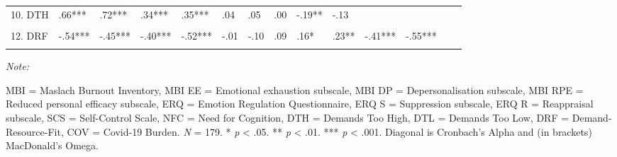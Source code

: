 \documentclass[
  english,
  man,floatsintext]{apa6}
\begin{document}
\begin{landscape}
\begin{table}
{\begin{threeparttable}
\begin{tabular}[t]{llllllllllllll}
10. DTH & .66*** & .72*** & .34*** & .35*** & .04 & .05 & .00 & -.19** & -.13 &  &  &  & \\
\addlinespace
\cellcolor{gray!6}{11. DTL} & \cellcolor{gray!6}{.44***} & \cellcolor{gray!6}{.35***} & \cellcolor{gray!6}{.37***} & \cellcolor{gray!6}{.42***} & \cellcolor{gray!6}{.01} & \cellcolor{gray!6}{.16*} & \cellcolor{gray!6}{-.13} & \cellcolor{gray!6}{-.18*} & \cellcolor{gray!6}{-.15*} & \cellcolor{gray!6}{.40***} & \cellcolor{gray!6}{} & \cellcolor{gray!6}{} & \cellcolor{gray!6}{}\\
12. DRF & -.54*** & -.45*** & -.40*** & -.52*** & -.01 & -.10 & .09 & .16* & .23** & -.41*** & -.55*** &  & \\
\cellcolor{gray!6}{13. COV} & \cellcolor{gray!6}{.23**} & \cellcolor{gray!6}{.32***} & \cellcolor{gray!6}{.07} & \cellcolor{gray!6}{.00} & \cellcolor{gray!6}{-.02} & \cellcolor{gray!6}{.02} & \cellcolor{gray!6}{-.06} & \cellcolor{gray!6}{-.03} & \cellcolor{gray!6}{.14} & \cellcolor{gray!6}{.44***} & \cellcolor{gray!6}{.08} & \cellcolor{gray!6}{-.12} & \cellcolor{gray!6}{}\\
\bottomrule
\end{tabular}
\begin{tablenotes}
\item \textit{Note: } 
\item MBI = Maslach Burnout Inventory, MBI EE = Emotional exhaustion subscale, MBI DP = Depersonalisation subscale, MBI RPE = Reduced personal efficacy subscale, ERQ = Emotion Regulation Questionnaire, ERQ S = Suppression subscale, ERQ R = Reappraisal subscale, SCS = Self-Control Scale, NFC = Need for Cognition, DTH = Demands Too High, DTL = Demands Too Low, DRF = Demand-Resource-Fit, COV = Covid-19 Burden. \textit{N} = 179. * \textit{p} < .05. ** \textit{p} < .01. *** \textit{p} < .001. Diagonal is Cronbach's Alpha and (in brackets) MacDonald's Omega.
\end{tablenotes}
\end{threeparttable}}
\end{table}
\end{landscape}
\end{document}
